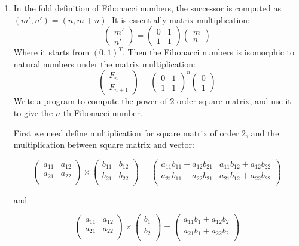 \documentclass[UTF8]{article}
\begin{document}
\begin{enumerate}
\item {In the fold definition of Fibonacci numbers, the successor is computed as $(m', n') = (n, m + n)$. It is essentially matrix multiplication:
\[
\begin{pmatrix} m' \\ n' \end{pmatrix} =
\begin{pmatrix} 0 & 1 \\ 1 & 1 \end{pmatrix}
\begin{pmatrix} m \\ n \end{pmatrix}
\]
Where it starts from $(0, 1)^T$. Then the Fibonacci numbers is isomorphic to natural numbers under the matrix multiplication:
\[
\begin{pmatrix}F_n \\ F_{n+1} \end{pmatrix} = \begin{pmatrix} 0 & 1 \\ 1 & 1 \end{pmatrix}^n\begin{pmatrix} 0 \\ 1 \end{pmatrix}
\]
Write a program to compute the power of 2-order square matrix, and use it to give the $n$-th Fibonacci number.}

First we need define multiplication for square matrix of order 2, and the multiplication between square matrix and vector:

\[
\begin{pmatrix}
a_{11} & a_{12} \\
a_{21} & a_{22} \\
\end{pmatrix}
\times
\begin{pmatrix}
b_{11} & b_{12} \\
b_{21} & b_{22} \\
\end{pmatrix}
=
\begin{pmatrix}
a_{11} b_{11} + a_{12} b_{21} & a_{11} b_{12} + a_{12} b_{22} \\
a_{21} b_{11} + a_{22} b_{21} & a_{21} b_{12} + a_{22} b_{22} \\
\end{pmatrix}
\]

and

\[
\begin{pmatrix}
a_{11} & a_{12} \\
a_{21} & a_{22} \\
\end{pmatrix}
\times
\begin{pmatrix}
b_{1} \\
b_{2} \\
\end{pmatrix}
=
\begin{pmatrix}
a_{11} b_{1} + a_{12} b_{2} \\
a_{21} b_{1} + a_{22} b_{2} \\
\end{pmatrix}
\]


\end{enumerate}
\end{document}
